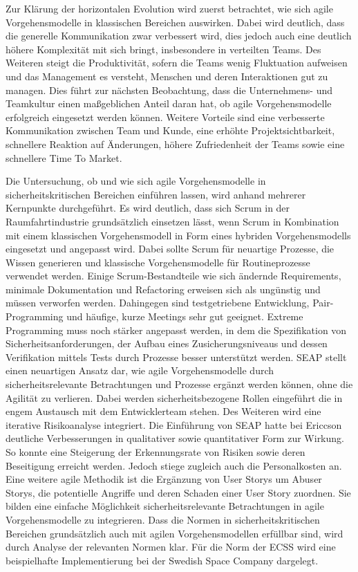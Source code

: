 Zur Klärung der horizontalen Evolution wird zuerst betrachtet, wie sich agile Vorgehensmodelle in klassischen Bereichen auswirken.
Dabei wird deutlich, dass die generelle Kommunikation zwar verbessert wird, dies jedoch auch eine deutlich höhere Komplexität mit sich bringt, insbesondere in verteilten Teams.
Des Weiteren steigt die Produktivität, sofern die Teams wenig Fluktuation aufweisen und das Management es versteht, Menschen und deren Interaktionen gut zu managen.
Dies führt zur nächsten Beobachtung, dass die Unternehmens- und Teamkultur einen maßgeblichen Anteil daran hat, ob agile Vorgehensmodelle erfolgreich eingesetzt werden können.
Weitere Vorteile sind eine verbesserte Kommunikation zwischen Team und Kunde, eine erhöhte Projektsichtbarkeit, schnellere Reaktion auf Änderungen, höhere Zufriedenheit der Teams sowie eine schnellere Time To Market.

Die Untersuchung, ob und wie sich agile Vorgehensmodelle in sicherheitskritischen Bereichen einführen lassen, wird anhand mehrerer Kernpunkte durchgeführt.
Es wird deutlich, dass sich Scrum in der Raumfahrtindustrie grundsätzlich einsetzen lässt, wenn Scrum in Kombination mit einem klassischen Vorgehensmodell in Form eines hybriden Vorgehensmodells eingesetzt und angepasst wird.
Dabei sollte Scrum für neuartige Prozesse, die Wissen generieren und klassische Vorgehensmodelle für Routineprozesse verwendet werden.
Einige Scrum-Bestandteile wie sich ändernde Requirements, minimale Dokumentation und Refactoring erweisen sich als ungünstig und müssen verworfen werden.
Dahingegen sind testgetriebene Entwicklung, Pair-Programming und häufige, kurze Meetings sehr gut geeignet.
Extreme Programming muss noch stärker angepasst werden, in dem die Spezifikation von Sicherheitsanforderungen, der Aufbau eines Zusicherungsniveaus und dessen Verifikation mittels Tests durch Prozesse besser unterstützt werden.
SEAP stellt einen neuartigen Ansatz dar, wie agile Vorgehensmodelle durch sicherheitsrelevante Betrachtungen und Prozesse ergänzt werden können, ohne die Agilität zu verlieren.
Dabei werden sicherheitsbezogene Rollen eingeführt die in engem Austausch mit dem Entwicklerteam stehen.
Des Weiteren wird eine iterative Risikoanalyse integriert.
Die Einführung von SEAP hatte bei Ericcson deutliche Verbesserungen in qualitativer sowie quantitativer Form zur Wirkung.
So konnte eine Steigerung der Erkennungsrate von Risiken sowie deren Beseitigung erreicht werden. 
Jedoch stiege zugleich auch die Personalkosten an.
Eine weitere agile Methodik ist die Ergänzung von User Storys um Abuser Storys, die potentielle Angriffe und deren Schaden einer User Story zuordnen.
Sie bilden eine einfache Möglichkeit sicherheitsrelevante Betrachtungen in agile Vorgehensmodelle zu integrieren.
Dass die Normen in sicherheitskritischen Bereichen grundsätzlich auch mit agilen Vorgehensmodellen erfüllbar sind, wird durch Analyse der relevanten Normen klar.
Für die Norm der ECSS wird eine beispielhafte Implementierung bei der Swedish Space Company dargelegt.

